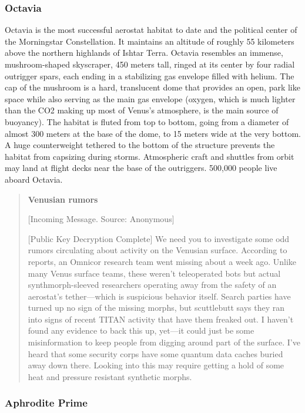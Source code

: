 \subsubsection{Octavia}
\label{sec:octavia} 

Octavia is the most successful aerostat habitat to date and the political center of the Morningstar Constellation. It maintains an altitude of roughly 55 kilometers above the northern highlands of Ishtar Terra. Octavia resembles an immense, mushroom-shaped skyscraper, 450 meters tall, ringed at its center by four radial outrigger spars, each ending in a stabilizing gas envelope filled with helium. The cap of the mushroom is a hard, translucent dome that provides an open, park like space while also serving as the main gas envelope (oxygen, which is much lighter than the CO2 making up most of Venus's atmosphere, is the main source of buoyancy). The habitat is fluted from top to bottom, going from a diameter of almost 300 meters at the base of the dome, to 15 meters wide at the very bottom. A huge counterweight tethered to the bottom of the structure prevents the habitat from capsizing during storms. Atmospheric craft and shuttles from orbit may land at flight decks near the base of the outriggers. 500,000 people live aboard Octavia. 

\begin{quotation}
\textbf{Venusian rumors} 

 [Incoming Message. Source: Anonymous] 

 [Public Key Decryption Complete]  We need you to investigate some odd rumors circulating about activity on the Venusian surface. According to reports, an Omnicor research team went missing about a week ago. Unlike many Venus surface teams, these weren't teleoperated bots but actual synthmorph-sleeved researchers operating away from the safety of an aerostat's tether—which is suspicious behavior itself. Search parties have turned up no sign of the missing morphs, but scuttlebutt says they ran into signs of recent TITAN activity that have them freaked out. I haven't found any evidence to back this up, yet—it could just be some misinformation to keep people from digging around part of the surface. I've heard that some security corps have some quantum data caches buried away down there. Looking into this may require getting a hold of some heat and pressure resistant synthetic morphs.
\end{quotation} 

\subsubsection{Aphrodite Prime}
\label{sec:aphrodite-prime} 

